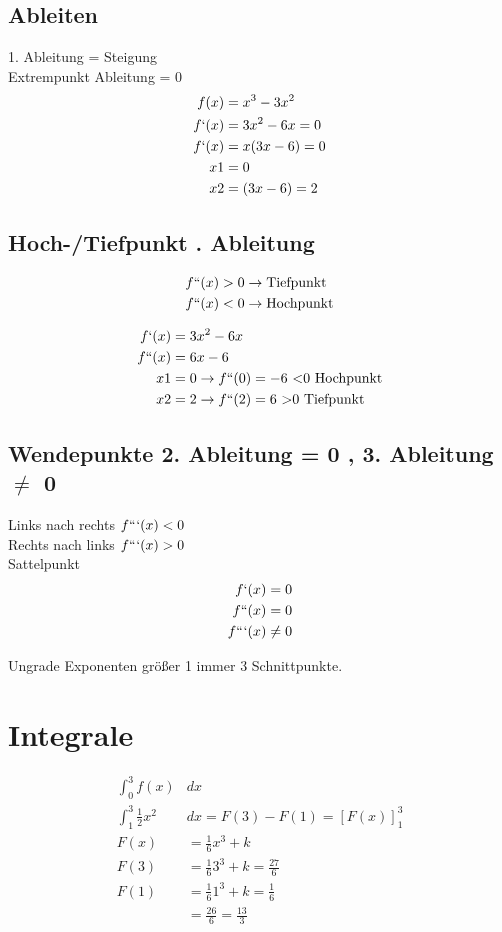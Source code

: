 \subsection{Ableiten}
1. Ableitung = Steigung \\
Extrempunkt Ableitung = 0 \\
\begin{align*}
  f(x) &= x^3 - 3x^2 \\
  f`(x) &= 3x^2 - 6x = 0 \\
  f`(x) &= x (3x - 6) = 0 \\
  x1 &= 0 \\
  x2 &= (3x - 6) = 2\\
\end{align*}

\subsection{Hoch-/Tiefpunkt . Ableitung}
\begin{align*}
  f``(x) > 0 &\rightarrow \text{Tiefpunkt} \\
  f``(x) < 0 &\rightarrow \text{Hochpunkt}
\end{align*}

\begin{align*}
  f`(x) &= 3x^2 - 6x\\
  f``(x) &= 6x - 6 \\
  x1 &= 0 \rightarrow  f``(0) = -6 \ \text{<0 Hochpunkt} \\
  x2 &= 2 \rightarrow  f``(2) = 6 \ \text{>0 Tiefpunkt}
\end{align*}

\subsection{Wendepunkte 2. Ableitung = 0 , 3. Ableitung $\neq{}$ 0}
Links nach rechts $f```(x) < 0$ \\
Rechts nach links $f```(x) > 0$ \\
Sattelpunkt
\begin{align*}
  f`(x) &= 0 \\
  f``(x) &= 0 \\
  f```(x) & \neq{} 0 \\
\end{align*}

Ungrade Exponenten größer 1 immer 3 Schnittpunkte.

\section{Integrale}
\begin{align*}
\int_0^3 f(x) &dx \\
\int_1^3 \frac{1}{2}x^2 &dx = F(3) - F(1) = [F(x)]_1^3 \\
F(x) &= \frac{1}{6} x^3 +k \\
F(3) &= \frac{1}{6} 3^3 +k  = \frac{27}{6} \\
F(1) &= \frac{1}{6} 1^3 +k  = \frac{1}{6} \\
&= \frac{26}{6} = \frac{13}{3}
\end{align*}

